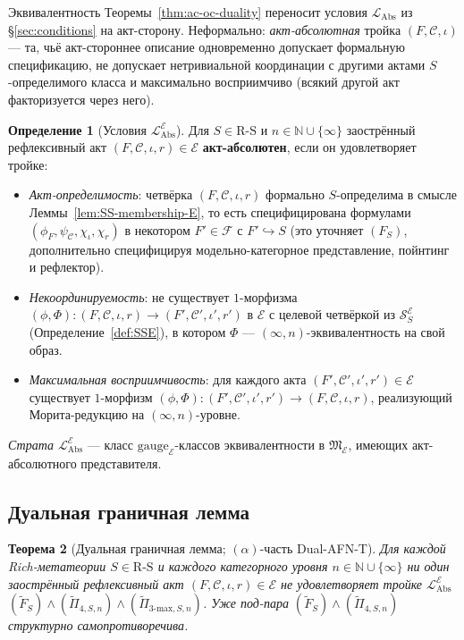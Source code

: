 \documentclass[11pt]{article}
\theoremstyle{plain}
\newtheorem{theorem}{Теорема}[section]
\theoremstyle{definition}
\newtheorem{definition}[theorem]{Определение}
\newcommand{\RS}{\mathrm{R\text{-}S}}
\newcommand{\cS}{\mathcal{S}}
\newcommand{\cF}{\mathcal{F}}
\newcommand{\cC}{\mathcal{C}}
\newcommand{\fM}{\mathfrak{M}}
\newcommand{\LAbs}{\mathcal{L}_{\mathrm{Abs}}}
\newcommand{\cE}{\mathcal{E}}
\newcommand{\LAbsE}{\LAbs^{\cE}}
\newcommand{\SSE}{\cS_{S}^{\cE}}
\begin{document}
Эквивалентность Теоремы~\ref{thm:ac-oc-duality} переносит условия $\LAbs$ из \S\ref{sec:conditions} на акт-сторону. Неформально: \emph{акт-абсолютная} тройка $(F, \cC, \iota)$ — та, чьё акт-стороннее описание одновременно допускает формальную спецификацию, не допускает нетривиальной координации с другими актами $S$-определимого класса и максимально восприимчиво (всякий другой акт факторизуется через него).

\begin{definition}[Условия $\LAbsE$]\label{def:level6-cE}
Для $S \in \RS$ и $n \in \mathbb{N} \cup \{\infty\}$ заострённый рефлексивный акт $(F, \cC, \iota, r) \in \cE$ \textbf{акт-абсолютен}, если он удовлетворяет тройке:
\begin{itemize}
\item[$(\tilde{F}_S)$] \emph{Акт-определимость}: четвёрка $(F, \cC, \iota, r)$ формально $S$-определима в смысле Леммы~\ref{lem:SS-membership-E}, то есть специфицирована формулами $(\phi_F, \psi_\cC, \chi_\iota, \chi_r)$ в некотором $F' \in \cF$ с $F' \hookrightarrow S$ (это уточняет $(F_S)$, дополнительно специфицируя модельно-категорное представление, пойнтинг и рефлектор).
\item[$(\tilde{\Pi}_{4, S, n})$] \emph{Некоординируемость}: не существует $1$-морфизма $(\phi, \Phi) : (F, \cC, \iota, r) \to (F', \cC', \iota', r')$ в $\cE$ с целевой четвёркой из $\SSE$ (Определение~\ref{def:SSE}), в котором $\Phi$ — $(\infty, n)$-эквивалентность на свой образ.
\item[$(\tilde{\Pi}_{3\text{-max}, S, n})$] \emph{Максимальная восприимчивость}: для каждого акта $(F', \cC', \iota', r') \in \cE$ существует $1$-морфизм $(\phi, \Phi) : (F', \cC', \iota', r') \to (F, \cC, \iota, r)$, реализующий Морита-редукцию на $(\infty, n)$-уровне.
\end{itemize}
\emph{Страта $\LAbsE$} — класс $\mathrm{gauge}_\cE$-классов эквивалентности в $\fM_\cE$, имеющих акт-абсолютного представителя.
\end{definition}

\subsection{Дуальная граничная лемма}

\begin{theorem}[Дуальная граничная лемма; $(\alpha)$-часть Dual-AFN-T]\label{thm:dual-afnt}
Для каждой Rich-метатеории $S \in \RS$ и каждого категорного уровня $n \in \mathbb{N} \cup \{\infty\}$ ни один заострённый рефлексивный акт $(F, \cC, \iota, r) \in \cE$ не удовлетворяет тройке $\LAbsE$ $(\tilde{F}_S) \wedge (\tilde{\Pi}_{4, S, n}) \wedge (\tilde{\Pi}_{3\text{-max}, S, n})$. Уже под-пара $(\tilde{F}_S) \wedge (\tilde{\Pi}_{4, S, n})$ структурно самопротиворечива.
\end{theorem}
\end{document}
